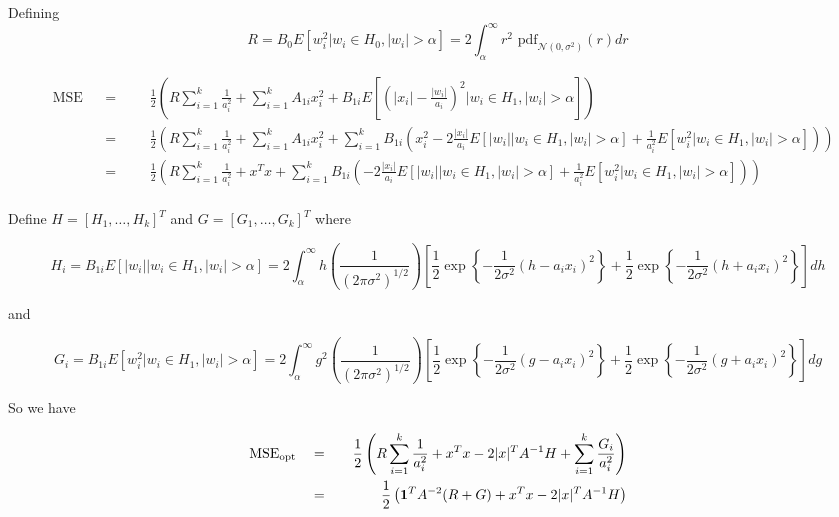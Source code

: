 \documentclass[english]{article}
\begin{document}
Defining
\begin{equation}
R = B_0E\left[w_i^2|w_i\in H_0,|w_i|>\alpha\right] =2\int_\alpha^\infty r^2\text{ pdf}_{\mathcal{N}(0,\sigma^2)}(r)dr
\end{equation}

\begin{equation}
\begin{aligned}
&\text{MSE}
&&=
&&&\frac{1}{2}\left(R\sum_{i=1}^k\frac{1}{a_i^2} +\sum_{i=1}^kA_{1i}x_i^2+B_{1i}E\left[\left(|x_i|-\frac{|w_i|}{a_i}\right)^2| w_i\in H_1,|w_i|>\alpha\right]\right)\\
&&&=
&&&\frac{1}{2}\left(R\sum_{i=1}^k\frac{1}{a_i^2} +\sum_{i=1}^kA_{1i}x_i^2+ \sum_{i=1}^kB_{1i}\left(x_i^2 -2\frac{|x_i|}{a_i}E[|w_i|| w_i\in H_1, |w_i|>\alpha] + \frac{1}{a_i^2}E[w_i^2|w_i\in H_1, |w_i|>\alpha]\right)\right)\\
&&&=
&&&\frac{1}{2}\left(R\sum_{i=1}^k\frac{1}{a_i^2} +x^Tx+ \sum_{i=1}^kB_{1i}\left( -2\frac{|x_i|}{a_i}E[|w_i|| w_i\in H_1, |w_i|>\alpha] + \frac{1}{a_i^2}E[w_i^2|w_i\in H_1, |w_i|>\alpha]\right)\right)\\
\end{aligned}
\end{equation}

Define $H=[H_1,\dots,H_k]^T$ and $G=[G_1,\dots,G_k]^T$ where

\begin{equation}
H_i = B_{1i}E[|w_i|| w_i\in H_1, |w_i|>\alpha] = 2\int_\alpha^\infty h\left(\frac{1}{(2\pi\sigma^2)^{1/2}}\right)\left[\frac{1}{2}\exp\left\{-\frac{1}{2\sigma^2}\left(h-a_ix_i\right)^2\right\}+\frac{1}{2}\exp\left\{-\frac{1}{2\sigma^2}\left(h+a_ix_i\right)^2\right\}\right]dh
\end{equation}

and

\begin{equation}
G_i = B_{1i}E[w_i^2|w_i\in H_1, |w_i|>\alpha] = 2\int_\alpha^\infty g^2\left(\frac{1}{(2\pi\sigma^2)^{1/2}}\right)\left[\frac{1}{2}\exp\left\{-\frac{1}{2\sigma^2}\left(g-a_ix_i\right)^2\right\}+\frac{1}{2}\exp\left\{-\frac{1}{2\sigma^2}\left(g+a_ix_i\right)^2\right\}\right]dg
\end{equation}

So we have

\begin{equation}
\begin{aligned}
&\text{MSE}_{\text{opt}}
&&=
&&&\frac{1}{2}\left(R\sum_{i=1}^k\frac{1}{a_i^2} +x^Tx - 2|x|^TA^{-1}H + \sum_{i=1}^k\frac{G_i}{a_i^2}\right)\\
&&&=
&&&\frac{1}{2}\left(\mathbf 1^TA^{-2}(R+G) +x^Tx - 2|x|^TA^{-1}H\right)\\
\end{aligned}
\end{equation}
\end{document}
